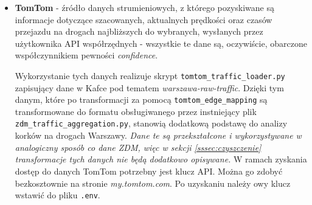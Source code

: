 \documentclass[12pt]{article}
\begin{document}
\begin{itemize}
        Przykład zapytania API (parametry używane w projekcie):
        \begin{tcolorbox}
        \begin{verbatim}
    https://api.open-meteo.com/v1/forecast?
    latitude=52.2297&
    longitude=21.0122&
    hourly=temperature_2m,precipitation,rain,snowfall,wind_speed_10m,
    visibility,weather_code&
    forecast_days=1&
    timezone=Europe/Warsaw
        \end{verbatim}
        \end{tcolorbox}

        Przykładowy fragment odpowiedzi (rzeczywisty wynik, skrócony do kilku godzin):
        \begin{tcolorbox}
        \begin{verbatim}
{
    "latitude": 52.23009,
    "longitude": 21.017075,
    "timezone": "Europe/Warsaw",
    "hourly": {
        "time": [
            "2026-05-22T00:00",
            "2026-05-22T01:00",
            "2026-05-22T02:00"
        ],
        "temperature_2m": [16.9, 15.9, 14.9],
        "precipitation": [0.0, 0.0, 0.0],
        "wind_speed_10m": [11.2, 8.6, 6.1],
        "weather_code": [3, 0, 3]
    }
}
        \end{verbatim}
        \end{tcolorbox}
        \item \textbf{TomTom} - źródło danych strumieniowych, z którego pozyskiwane są informacje dotyczące szacowanych, aktualnych 
        prędkości oraz czasów przejazdu na drogach najbliższych do wybranych, wysłanych przez użytkownika API współrzędnych - wszystkie te dane są, 
        oczywiście, obarczone współczynnikiem pewności \emph{confidence}.

        Wykorzystanie tych danych realizuje skrypt \verb|tomtom_traffic_loader.py| zapisujący dane w Kafce pod tematem \emph{warszawa-raw-traffic}.
        Dzięki tym danym, które po transformacji za pomocą \verb|tomtom_edge_mapping| są transformowane do formatu obsługiwanego przez instniejący plik  
        \verb|zdm_traffic_aggregation.py|, stanowią dodatkową podstawę do analizy korków na drogach Warszawy. \emph{Dane te są przekształcone i wykorzystywane
        w analogiczny sposób co dane ZDM, więc w sekcji \ref{sssec:czyszczenie} transformacje tych danych nie będą dodatkowo opisywane.}
        W ramach zyskania dostęp do danych TomTom potrzebny jest klucz API. Można go zdobyć bezkosztownie na stronie \emph{my.tomtom.com}. Po uzyskaniu
        należy owy klucz wstawić do pliku \verb|.env|.


\end{itemize}
\end{document}
